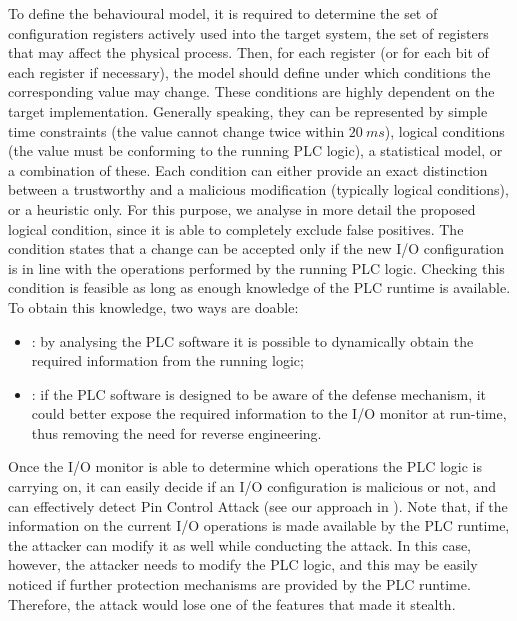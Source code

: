 To define the behavioural model, it is required to determine the set of configuration registers actively used into the target system,
\ie the set of registers that may affect the physical process. Then, for each register (or for each bit of each register if necessary),
the model should define under which conditions the corresponding value may change. These conditions are highly dependent on the target implementation.
Generally speaking, they can be represented by simple time constraints (\eg the value cannot change twice within $\SI{20}{ms}$),
logical conditions (\eg the value must be conforming to the running PLC logic), a statistical model, or a combination of these.
Each condition can either provide an exact distinction between a trustworthy and a malicious modification (typically logical conditions),
or a heuristic only. For this purpose, we analyse in more detail the proposed logical condition, since it is able to completely exclude false positives.
The condition states that a change can be accepted only if the new I/O configuration is in line with the operations performed by the running PLC logic.
Checking this condition is feasible as long as enough knowledge of the PLC runtime is available. To obtain this knowledge, two ways are doable:
\begin{itemize}
	\item {}: by analysing the PLC software it is possible to dynamically obtain the required information from the running logic;
	\item {}: if the PLC software is designed to be aware of the defense mechanism,
		it could better expose the required information to the I/O monitor at run-time, thus removing the need for reverse engineering.
\end{itemize}
Once the I/O monitor is able to determine which operations the PLC logic is carrying on, it can easily decide if an I/O configuration is malicious or not,
and can effectively detect Pin Control Attack (see our approach in ).
Note that, if the information on the current I/O operations is made available by the PLC runtime, the attacker can modify it as well while conducting the attack.
In this case, however, the attacker needs to modify the PLC logic, and this may be easily noticed if further protection mechanisms are provided by the PLC runtime.
Therefore, the attack would lose one of the features that made it stealth.

